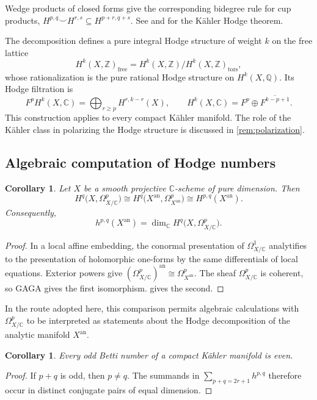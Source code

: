 \documentclass[11pt,reqno]{amsart}
\newtheorem{corollary}[theorem]{Corollary}
\theoremstyle{definition}
\theoremstyle{remark}
\newcommand{\C}{\mathbb{C}}
\newcommand{\Z}{\mathbb{Z}}
\newcommand{\Q}{\mathbb{Q}}
\newcommand{\Xan}{X^{\mathrm{an}}}
\begin{document}
Wedge products of closed forms give the corresponding bidegree rule for
cup products,
$H^{p,q}\smile H^{r,s}\subseteq H^{p+r,q+s}$.
See \cite[\S6.1]{voisin2002hodge} and
\cite[\S3.2]{huybrechts2005complex} for the K\"ahler Hodge theorem.

The decomposition defines a pure integral Hodge structure of weight $k$ on the
free lattice
\[
H^k(X,\Z)_{\mathrm{free}}
=H^k(X,\Z)/H^k(X,\Z)_{\mathrm{tors}},
\]
whose rationalization is the pure rational Hodge structure on $H^k(X,\Q)$.
Its Hodge filtration is
\[
F^pH^k(X,\C)=\bigoplus_{r\geq p}H^{r,k-r}(X),
\qquad
H^k(X,\C)=F^p\oplus\overline{F^{k-p+1}}.
\]
This construction applies to every compact K\"ahler manifold. The role of
the K\"ahler class in polarizing the Hodge structure is discussed in
\cref{rem:polarization}.

\subsection{Algebraic computation of Hodge numbers}
\label{subsec:algebraicity}

\begin{corollary}
\label{cor:algebraic-hodge}
Let $X$ be a smooth projective $\C$-scheme of pure dimension. Then
\[
H^q\bigl(X,\Omega^p_{X/\C}\bigr)
\cong
H^q\bigl(\Xan,\Omega^p_{\Xan}\bigr)
\cong
H^{p,q}(\Xan).
\]
Consequently,
\[
h^{p,q}(\Xan)
=\dim_{\C}H^q\bigl(X,\Omega^p_{X/\C}\bigr).
\]
\end{corollary}

\begin{proof}
In a local affine embedding, the conormal presentation of
$\Omega^1_{X/\C}$ analytifies to the presentation of holomorphic
one-forms by the same differentials of local equations. Exterior powers
give $(\Omega^p_{X/\C})^{\mathrm{an}}\cong\Omega^p_{\Xan}$.
The sheaf $\Omega^p_{X/\C}$ is coherent, so GAGA gives the first
isomorphism.  gives the second.
\end{proof}

In the route adopted here, this comparison permits algebraic calculations with
$\Omega^p_{X/\C}$ to be interpreted as statements about the Hodge decomposition
of the analytic manifold $\Xan$.

\begin{corollary}
\label{cor:odd-betti}
Every odd Betti number of a compact K\"ahler manifold is even.
\end{corollary}

\begin{proof}
If $p+q$ is odd, then $p\neq q$. The summands in
$\sum_{p+q=2r+1}h^{p,q}$ therefore occur in distinct conjugate pairs of equal
dimension.
\end{proof}
\end{document}
